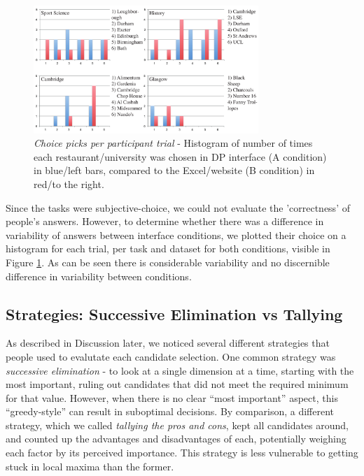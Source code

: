 \documentclass{sigchi}
\begin{document}
\begin{figure}[htb]
\begin{center}
\includegraphics[width=8.5cm]{img/results}
\caption{\emph{Choice picks per participant trial} - Histogram of number of times each restaurant/university was chosen in DP interface (A condition) in blue/left bars, compared to the Excel/website (B condition) in red/to the right.}
\label{fig:chosen_results}
\end{center}
\end{figure}

Since the tasks were subjective-choice, we could not evaluate the 'correctness' of people's answers.  However, to determine whether there was a difference in variability of answers between interface conditions, we plotted their choice on a histogram for each trial, per task and dataset for both conditions, visible in Figure \ref{fig:chosen_results}.  As can be seen there is considerable variability and no discernible difference in variability between conditions.  

\subsection{Strategies: Successive Elimination vs Tallying}
As described in Discussion later, we noticed several different strategies that people used to evalutate each candidate selection. One common strategy was \emph{successive elimination} - to look at a single dimension at a time, starting with the most important, ruling out candidates that did not meet the required minimum for that value.  However, when there is no clear ``most important'' aspect, this  ``greedy-style'' can result in suboptimal decisions.  By comparison, a different strategy, which we called \emph{tallying the pros and cons}, kept all candidates around, and counted up the advantages and disadvantages of each, potentially weighing each factor by its perceived importance.  This strategy is less vulnerable to getting stuck in local maxima than the former.
\end{document}
